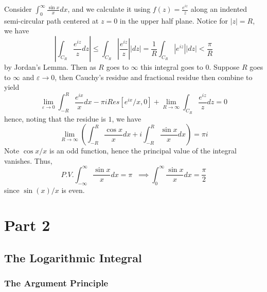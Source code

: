 \documentclass[12pt, a4paper, oneside, openright, titlepage]{book}
\begin{document}
\begin{eg}
    Consider $\int_0^{\infty}\frac{\sin x}{x}dx$, and we calculate it using $f(z) = \frac{e^{iz}}{z}$ along an indented semi-circular path centered at $z = 0$ in the upper half plane. Notice for $|z| = R$, we have \begin{equation*}
        \left|\int_{C_R}\frac{e^{iz}}{z}dz\right| \leq \int_{C_R}\left|\frac{e^{iz}}{z}\right||dz| = \frac{1}{R}\int_{C_R}\left|e^{iz}\right||dz| < \frac{\pi}{R}
    \end{equation*}
    by Jordan's Lemma. Then as $R$ goes to $\infty$ this integral goes to $0$. Suppose $R$ goes to $\infty$ and $\varepsilon \rightarrow 0$, then Cauchy's residue and fractional residue then combine to yield \begin{equation*}
        \lim\limits_{\varepsilon\rightarrow 0}\int_{-R}^R\frac{e^{ix}}{x}dx - \pi iRes[e^{ix}/x, 0] + \lim\limits_{R\rightarrow \infty}\int_{C_R}\frac{e^{iz}}{z}dz = 0
    \end{equation*}
    hence, noting that the residue is $1$, we have \begin{equation*}
        \lim\limits_{R\rightarrow \infty}\left(\int_{-R}^{R}\frac{\cos x}{x}dx + i\int_{-R}^{R}\frac{\sin x}{x}dx\right) = \pi i
    \end{equation*}
    Note $\cos x/x$ is an odd function, hence the principal value of the integral vanishes. Thus, \begin{equation*}
        P.V.\int_{-\infty}^{\infty}\frac{\sin x}{x}dx = \pi\;\;\implies \int_0^{\infty}\frac{\sin x}{x}dx = \frac{\pi}{2}
    \end{equation*}
    since $\sin(x)/x$ is even.
\end{eg}







\part{Part 2}

\chapter{The Logarithmic Integral}


\section{The Argument Principle}
\end{document}
